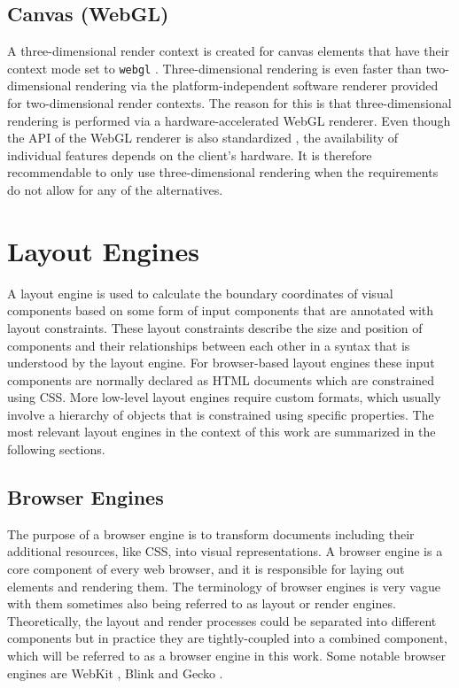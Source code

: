 \subsection{Canvas (WebGL)}
\label{sec:CanvasWebGL}

A three-dimensional render context is created for canvas elements that have their context mode set to \lstinline{webgl} .
Three-dimensional rendering is even faster than two-dimensional rendering via the platform-independent software renderer provided for two-dimensional render contexts.
The reason for this is that three-dimensional rendering is performed via a hardware-accelerated WebGL renderer.
Even though the API of the WebGL renderer is also standardized \parencite{WebGL}, the availability of individual features depends on the client's hardware.
It is therefore recommendable to only use three-dimensional rendering when the requirements do not allow for any of the alternatives.

\section{Layout Engines}

A layout engine is used to calculate the boundary coordinates of visual components based on some form of input components that are annotated with layout constraints. 
These layout constraints describe the size and position of components and their relationships between each other in a syntax that is understood by the layout engine. 
For browser-based layout engines these input components are normally declared as HTML documents which are constrained using CSS. 
More low-level layout engines require custom formats, which usually involve a hierarchy of objects that is constrained using specific properties. 
The most relevant layout engines in the context of this work are summarized in the following sections.

\subsection{Browser Engines}
\label{sec:BrowserEngines}

The purpose of a browser engine is to transform documents including their additional resources, like CSS, into visual representations. 
A browser engine is a core component of every web browser, and it is responsible for laying out elements and rendering them. 
The terminology of browser engines is very vague with them sometimes also being referred to as layout or render engines. 
Theoretically, the layout and render processes could be separated into different components but in practice they are tightly-coupled into a combined component, which will be referred to as a browser engine in this work. 
Some notable browser engines are WebKit \parencite{WebKit}, Blink \parencite{Blink} and Gecko \parencite{Gecko}.

